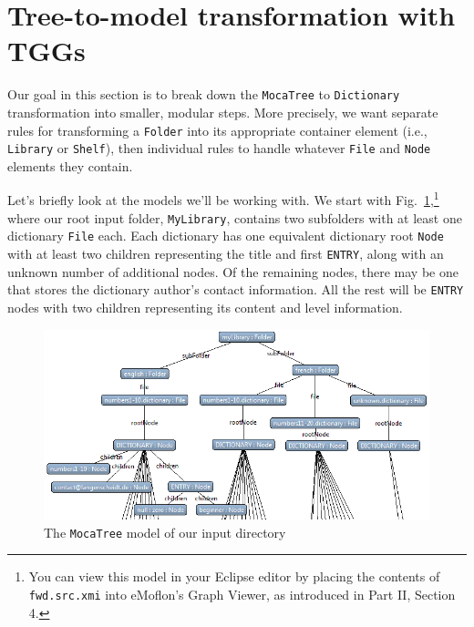 \newpage
\section{Tree-to-model transformation with TGGs}
\genHeader

Our goal in this section is to break down the \texttt{MocaTree} to \texttt{Dictionary} transformation into smaller, modular steps. More precisely, we
want separate rules for transforming a \texttt{Folder} into its appropriate container element (i.e., \texttt{Library} or \texttt{Shelf}), then individual rules
to handle whatever \texttt{File} and \texttt{Node} elements they contain.

\vspace{0.5cm}

Let's briefly look at the models we'll be working with. We start with Fig.~\ref{eclipse:treeStart},\footnote{You can view this model in your Eclipse editor by
placing the contents of \texttt{fwd.src.xmi} into eMoflon's Graph Viewer, as introduced in Part II, Section 4.} where our root input folder, \texttt{MyLibrary},
contains two subfolders with at least one dictionary \texttt{File} each. Each dictionary has one equivalent dictionary root \texttt{Node} with at least two
children representing the title and first \texttt{ENTRY}, along with an unknown number of additional nodes. Of the remaining nodes, there may be one that stores
the dictionary author's contact information. All the rest will be \texttt{ENTRY} nodes with two children representing its content and level information.

\vspace{1cm}

\begin{figure}[htbp]
\hspace{-1.5cm}
 	\includegraphics[width=1.2\textwidth]{eclipse_TreeStartMetamodel}
 	\caption{The \texttt{MocaTree} model of our input directory}
 	\label{eclipse:treeStart}
\end{figure}

